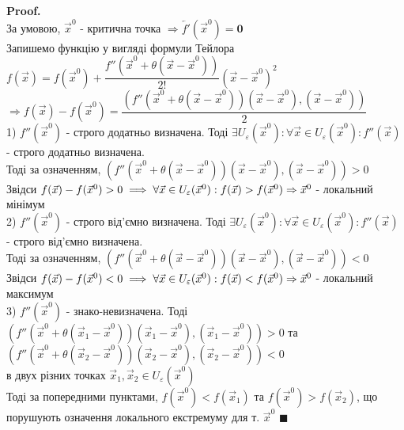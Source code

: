 \documentclass[a4paper, 14pt]{extarticle}
\def\bigline{\vspace{5mm}\\}
\theoremstyle{theoremdd}
\theoremstyle{theoremdd}
\theoremstyle{theoremdd}
\theoremstyle{theoremdd}
\theoremstyle{theoremdd}
\theoremstyle{theoremdd}
\theoremstyle{theoremdd}
\theoremstyle{theoremdd}
\newenvironment{pf}{\vspace*{-3mm} \textbf{Proof. \\}}{$\blacksquare$}
\begin{document}
\begin{pf}
За умовою, $\vec{x}^0$ - критична точка $\Rightarrow \overleftarrow{f'}(\vec{x}^0) = \textbf{0}$\\
Запишемо функцію у вигляді формули Тейлора\\
$f(\vec{x}) = f(\vec{x}^0) + \dfrac{f''(\vec{x}^0+\theta(\vec{x}-\vec{x}^0))}{2!}(\vec{x}-\vec{x}^0)^2$\\
$\Rightarrow f(\vec{x}) - f(\vec{x}^0) = \dfrac{(f''(\vec{x}^0 + \theta(\vec{x}-\vec{x}^0))(\vec{x}-\vec{x}^0), (\vec{x}-\vec{x}^0))}{2}$\\
1) $f''(\vec{x}^0)$ - строго додатньо визначена. Тоді $\exists U_{\varepsilon}(\vec{x}^0): \forall \vec{x} \in U_{\varepsilon}(\vec{x}^0): f''(\vec{x})$ - строго додатньо визначена. \\ Тоді за означенням, $(f''(\vec{x}^0 + \theta(\vec{x}-\vec{x}^0))(\vec{x}-\vec{x}^0), (\vec{x}-\vec{x}^0)) > 0$\\
Звідси $f(\vec{x})-f(\vec{x}^0) > 0 \implies \forall \vec{x} \in U_{\varepsilon}(\vec{x}^0): f(\vec{x}) > f(\vec{x}^0) \\ \Rightarrow \vec{x}^0$ - локальний мінімум
\bigline
2) $f''(\vec{x}^0)$ - строго від'ємно визначена. Тоді $\exists U_{\varepsilon}(\vec{x}^0): \forall \vec{x} \in U_{\varepsilon}(\vec{x}^0): f''(\vec{x})$ - строго від'ємно визначена. \\ Тоді за означенням, $(f''(\vec{x}^0 + \theta(\vec{x}-\vec{x}^0))(\vec{x}-\vec{x}^0), (\vec{x}-\vec{x}^0)) < 0$\\
Звідси $f(\vec{x})-f(\vec{x}^0) < 0 \implies \forall \vec{x} \in U_{\varepsilon}(\vec{x}^0): f(\vec{x}) < f(\vec{x}^0) \\ \Rightarrow \vec{x}^0$ - локальний максимум
\bigline
3) $f''(\vec{x}^0)$ - знако-невизначена. Тоді \\ $(f''(\vec{x}^0 + \theta(\vec{x}_1-\vec{x}^0))(\vec{x}_1-\vec{x}^0), (\vec{x}_1-\vec{x}^0)) > 0$ та \\ $(f''(\vec{x}^0 + \theta(\vec{x}_2-\vec{x}^0))(\vec{x}_2-\vec{x}^0), (\vec{x}_2-\vec{x}^0)) < 0$ \\ в двух різних точках $\vec{x}_1,\vec{x}_2 \in U_{\varepsilon}(\vec{x}^0)$\\
Тоді за попередними пунктами, $f(\vec{x}^0) < f(\vec{x}_1)$ та $f(\vec{x}^0) > f(\vec{x}_2)$, що порушують означення локального екстремуму для т. $\vec{x}^0$
\end{pf}
\bigline
\end{document}

